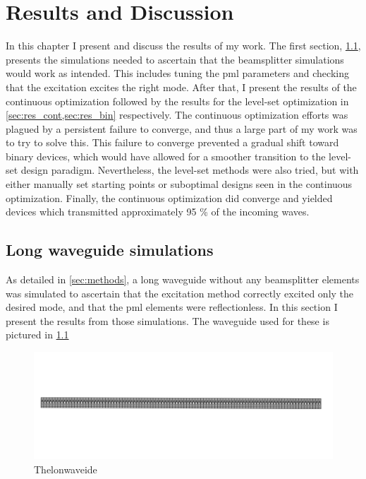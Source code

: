 \chapter{Results and Discussion}

In this chapter I present and discuss the results of my work.
The first section, \cref{sec:long_waveguide}, presents the simulations needed to
ascertain that the beamsplitter simulations would work as intended.
This includes tuning the \gls{pml} parameters and checking that the excitation
excites the right mode.
After that, I present the results of the continuous optimization followed by the
results for the level-set optimization in \cref{sec:res_cont,sec:res_bin}
respectively.
The continuous optimization efforts was plagued by a persistent failure to
converge, and thus a large part of my work was to try to solve this.
This failure to converge prevented a gradual shift toward binary devices,
which would have allowed for a smoother transition to the
level-set design paradigm.
Nevertheless, the level-set methods were also tried,
but with either manually set starting points or suboptimal designs seen in the
continuous optimization.
Finally, the continuous optimization did converge and yielded devices which
transmitted approximately 95 \% of the incoming waves.

\section{Long waveguide simulations}\label{sec:long_waveguide}

As detailed in \cref{sec:methods}, a long waveguide without any beamsplitter
elements was simulated to ascertain that the excitation method correctly excited
only the desired mode, and that the \gls{pml} elements were reflectionless.
In this section I present the results from those simulations.
The waveguide used for these is pictured in \cref{fig:long_waveguide}

\begin{figure}[htpb]
	\centering
	\includegraphics[width=\textwidth]{chapters/results/long_waveguide_geom.png}
	\caption{Thelonwaveide}
	\label{fig:long_waveguide}
\end{figure}

